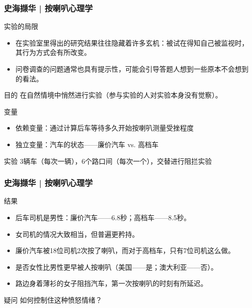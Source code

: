 \begin{frame}
  \frametitle{史海撷华 | 按喇叭心理学}
  \begin{block}{实验的局限}
    \begin{itemize}
      \item 在实验室里得出的研究结果往往隐藏着许多玄机：被试在得知自己被监视时，其行为方式会有所改变。
      \item 问卷调查的问题通常也具有提示性，可能会引导答题人想到一些原本不会想到的看法。
    \end{itemize}
  \end{block}
  \vspace{-0.5em}
  \pause
  \begin{block}{目的}
  在自然情境中悄然进行实验（参与实验的人对实验本身没有觉察）。
  \end{block}
  \vspace{-0.5em}
  \pause
  \begin{block}{变量}
    \begin{itemize}
      \item 依赖变量：通过计算后车等待多久开始按喇叭测量受挫程度
      \item 独立变量：汽车的状态——廉价汽车 vs. 高档车
    \end{itemize}
  \end{block}
  \vspace{-0.5em}
  \pause
  \begin{block}{实验}
 3辆车（每次一辆），6个路口间（每次一个），交替进行阻拦实验 
  \end{block}
\end{frame}

\begin{frame}
  \frametitle{史海撷华 | 按喇叭心理学}
  \begin{block}{结果}
    \begin{itemize}
      \item 后车司机是男性：廉价汽车——6.8秒；高档车——8.5秒。
      \item 女司机的情况大致相当，但普遍更矜持。
      \item 廉价汽车被18位司机2次按了喇叭，而对于高档车，只有7位司机这么做。
      \item 是否女性比男性更早被人按喇叭（美国——是；澳大利亚——否）。
      \item 路边身着薄衫的女子阻挡汽车，第一次按喇叭的时刻有所延迟。
    \end{itemize}
  \end{block}
  \pause
  \begin{block}{疑问}
    如何控制住这种愤怒情绪？
  \end{block}
\end{frame}

